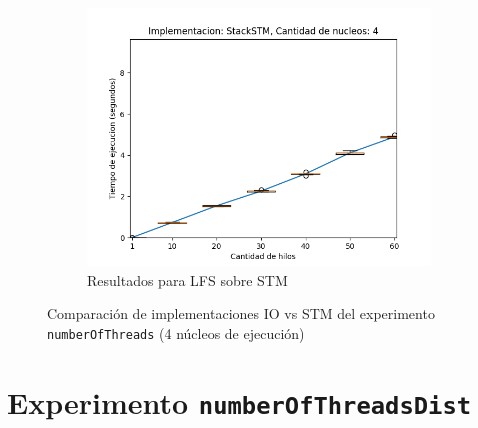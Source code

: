 \begin{appendices}
\begin{figure}[H]
\begin{subfigure}[b]{0.49\textwidth}
        \includegraphics[width=\textwidth]{images/numberOfThreads/plots/expStackSTM-4}
        \caption{Resultados para LFS sobre STM}
        \label{subfig:numberOfThreads-stackstm-4}
    \end{subfigure}
    \caption{Comparación de implementaciones IO vs STM del experimento \texttt{numberOfThreads} (4 núcleos de ejecución)}
    \label{fig:numberOfThreads-boxplots-4}
\end{figure}


\section{Experimento \texttt{numberOfThreadsDist}}


\end{appendices}
